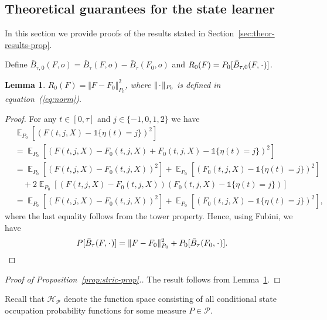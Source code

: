 \documentclass[numsec,webpdf,contemporary,medium,namedate]{oup-authoring-template}%
\theoremstyle{thmstyleone}%
\newtheorem{lemma}{Lemma}
\theoremstyle{thmstyletwo}%
\theoremstyle{thmstylethree}%
\DeclareMathOperator{\E}{\mathbb{E}} %
\newcommand{\blank}{\makebox[1ex]{\textbf{$\cdot$}}}
\newcommand{\1}{\mathds{1}}
\begin{document}
\begin{appendices}

\section{Theoretical guarantees for the state learner}
\label{sec:proof-proposition}

In this section we provide proofs of the results stated in
Section~\ref{sec:theor-results-prop}.

Define
\( \bar{B}_{\tau,0}(F, o) = \bar{B}_{\tau}(F, o) - \bar{B}_{\tau}(F_0, o) \) and
\( R_{0}(F) = P_0{[\bar{B}_{\tau,0}(F, \blank)]} \).
\begin{lemma}
  \label{lemma:norm}
  \( R_{0}(F) = \Vert F - F_0 \Vert_{P_0}^2 \), where \( \Vert \blank \Vert_{P_0}\) is defined
  in equation~(\ref{eq:norm}).
\end{lemma}
\begin{proof}
  For any \( t \in [0, \tau] \) and \( j\in \{-1,0,1,2\} \) we have
  \begin{align*}
    & \E_{P_0}{\left[ (F(t, j, X) - \1{\{\eta(t) = j \}})^2 \right]}
    \\
    & =    \E_{P_0}{\left[ (F(t, j, X) - F_0(t, j, X) + F_0(t, j, X) - \1{\{\eta(t) = j
      \}})^2 \right]}
    \\
    & =    \E_{P_0}{\left[ (F(t, j, X) - F_0(t, j, X))^2\right]}
      + \E_{P_0}{\left[ (F_0(t, j, X) - \1{\{\eta(t) = j \}})^2\right]}
    \\
    & \quad
      + 2\E_{P_0}{\left[ (F(t, j, X) - F_0(t, j, X))(F_0(t, j, X) - \1{\{\eta(t) = j
      \}})\right]}
    \\
    & =    \E_{P_0}{\left[ (F(t, j, X) - F_0(t, j, X))^2\right]}
      + \E_{P_0}{\left[ (F_0(t, j, X) - \1{\{\eta(t) = j \}})^2\right]},
  \end{align*}
  where the last equality follows from the tower property. Hence, using Fubini,
  we have
  \begin{equation*}
    P{[\bar{B}_{\tau}(F, \blank)]}
    = \Vert F - F_0 \Vert_{P_0}^2 + P_0{[\bar{B}_{\tau}(F_0, \blank)]}.
  \end{equation*}
\end{proof}

\begin{proof}[Proof of Proposition~\ref{prop:stric-prop}.]
  The result follows from Lemma~\ref{lemma:norm}.
\end{proof}

Recall that $\mathcal{H}_{\mathcal{P}}$ denote the function space consisting of
all conditional state occupation probability functions for some measure
\( P \in \mathcal{P} \).


\end{appendices}
\end{document}
